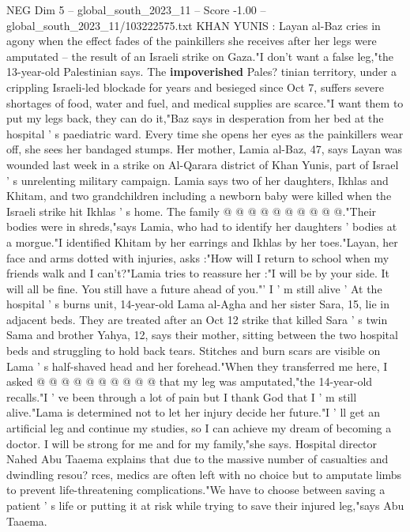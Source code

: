 \begin{textsample}{NEG Dim 5 – global\_south\_2023\_11 – Score -1.00 – global\_south\_2023\_11/103222575.txt}  \label{ex:f5_neg_202}
KHAN YUNIS : Layan al-Baz cries in agony when the effect fades of the painkillers she receives after her legs were amputated -- the result of an Israeli strike on Gaza."I don't want a false leg,"the 13-year-old Palestinian says.
The \textbf{impoverished} Pales? tinian territory, under a crippling Israeli-led blockade for years and besieged since Oct 7, suffers severe shortages of food, water and fuel, and medical supplies are scarce."I want them to put my legs back, they can do it,"Baz says in desperation from her bed at the hospital ' s paediatric ward.
Every time she opens her eyes as the painkillers wear off, she sees her bandaged stumps.
Her mother, Lamia al-Baz, 47, says Layan was wounded last week in a strike on Al-Qarara district of Khan Yunis, part of Israel ' s unrelenting military campaign.
Lamia says two of her daughters, Ikhlas and Khitam, and two grandchildren including a newborn baby were killed when the Israeli strike hit Ikhlas ' s home.
The family @ @ @ @ @ @ @ @ @ @."Their bodies were in shreds,"says Lamia, who had to identify her daughters ' bodies at a morgue."I identified Khitam by her earrings and Ikhlas by her toes."Layan, her face and arms dotted with injuries, asks :"How will I return to school when my friends walk and I can't?"Lamia tries to reassure her :"I will be by your side.
It will all be fine.
You still have a future ahead of you."' I ' m still alive ' At the hospital ' s burns unit, 14-year-old Lama al-Agha and her sister Sara, 15, lie in adjacent beds.
They are treated after an Oct 12 strike that killed Sara ' s twin Sama and brother Yahya, 12, says their mother, sitting between the two hospital beds and struggling to hold back tears.
Stitches and burn scars are visible on Lama ' s half-shaved head and her forehead."When they transferred me here, I asked @ @ @ @ @ @ @ @ @ @ that my leg was amputated,"the 14-year-old recalls."I ' ve been through a lot of pain but I thank God that I ' m still alive."Lama is determined not to let her injury decide her future."I ' ll get an artificial leg and continue my studies, so I can achieve my dream of becoming a doctor.
I will be strong for me and for my family,"she says.
Hospital director Nahed Abu Taaema explains that due to the massive number of casualties and dwindling resou? rces, medics are often left with no choice but to amputate limbs to prevent life-threatening complications."We have to choose between saving a patient ' s life or putting it at risk while trying to save their injured leg,"says Abu Taaema.

\end{textsample}
